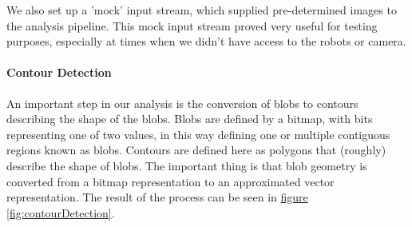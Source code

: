 \documentclass[10pt, abstracton, twocolumn]{scrartcl}
\newcommand{\fref}[1]{\hyperref[#1]{figure \vref{#1}}}
\begin{document}
We also set up a 'mock' input stream, which supplied pre-determined images to the analysis pipeline. This mock input stream proved very useful for testing purposes, especially at times when we didn't have access to the robots or camera.

\paragraph{Contour Detection}
An important step in our analysis is the conversion of blobs to contours describing the shape of the blobs. Blobs are defined by a bitmap, with bits representing one of two values, in this way defining one or multiple contiguous regions known as blobs. Contours are defined here as polygons that (roughly) describe the shape of blobs. The important thing is that blob geometry is converted from a bitmap representation to an approximated vector representation. The result of the process can be seen in \fref{fig:contourDetection}.
\end{document}
